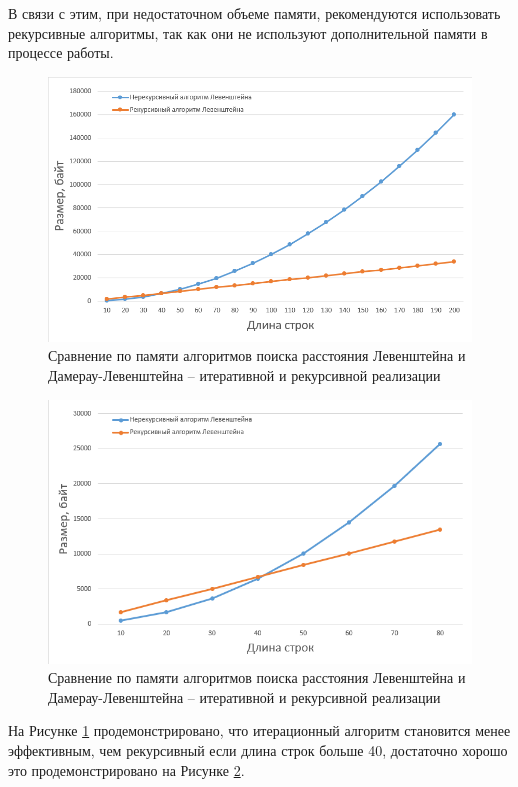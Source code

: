 \documentclass[a4paper,14pt, unknownkeysallowed]{bmstu}
\begin{document}
В связи с этим, при недостаточном объеме памяти, рекомендуются использовать рекурсивные алгоритмы, так как они не используют дополнительной памяти в процессе работы.

\begin{figure}[h]
	\centering
	\includegraphics[height=0.3\textheight]{img/diag_03.png}
	\caption{Сравнение по памяти алгоритмов поиска расстояния Левенштейна и Дамерау-Левенштейна -- итеративной и рекурсивной реализации}
	\label{plt:memory_01}
\end{figure}

\begin{figure}[h]
	\centering
	\includegraphics[height=0.3\textheight]{img/diag_04.png}
	\caption{Сравнение по памяти алгоритмов поиска расстояния Левенштейна и Дамерау-Левенштейна -- итеративной и рекурсивной реализации}
	\label{plt:memory_02}
\end{figure}

На Рисунке \ref{plt:memory_01} продемонстрировано, что итерационный алгоритм становится менее эффективным, чем рекурсивный если длина строк больше 40, достаточно хорошо это продемонстрировано на Рисунке \ref{plt:memory_02}.
\end{document}
